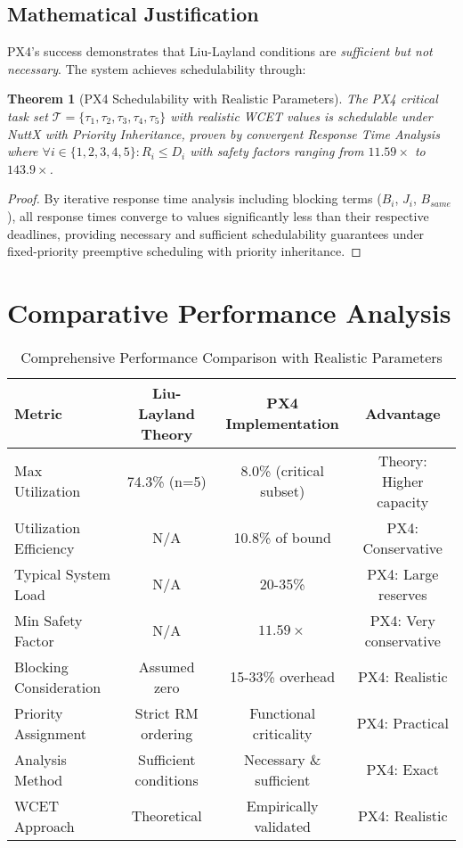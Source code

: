 \documentclass[12pt,a4paper]{article}
\newtheorem{theorem}{Theorem}
\begin{document}
\subsection{Mathematical Justification}

PX4's success demonstrates that Liu-Layland conditions are \emph{sufficient but not necessary}. The system achieves schedulability through:

\begin{theorem}[PX4 Schedulability with Realistic Parameters]
The PX4 critical task set $\mathcal{T} = \{\tau_1, \tau_2, \tau_3, \tau_4, \tau_5\}$ with realistic WCET values is schedulable under NuttX with Priority Inheritance, proven by convergent Response Time Analysis where $\forall i \in \{1,2,3,4,5\}: R_i \leq D_i$ with safety factors ranging from $11.59\times$ to $143.9\times$.
\end{theorem}

\begin{proof}
By iterative response time analysis including blocking terms ($B_i$, $J_i$, $B_{same}$), all response times converge to values significantly less than their respective deadlines, providing necessary and sufficient schedulability guarantees under fixed-priority preemptive scheduling with priority inheritance.
\end{proof}

\section{Comparative Performance Analysis}

\begin{table}[H]
\centering
\begin{tabular}{|l|c|c|c|}
\hline
\textbf{Metric} & \textbf{Liu-Layland Theory} & \textbf{PX4 Implementation} & \textbf{Advantage} \\
\hline
Max Utilization & 74.3\% (n=5) & 8.0\% (critical subset) & Theory: Higher capacity \\
Utilization Efficiency & N/A & 10.8\% of bound & PX4: Conservative \\
Typical System Load & N/A & 20-35\% & PX4: Large reserves \\
Min Safety Factor & N/A & $11.59\times$ & PX4: Very conservative \\
Blocking Consideration & Assumed zero & 15-33\% overhead & PX4: Realistic \\
Priority Assignment & Strict RM ordering & Functional criticality & PX4: Practical \\
Analysis Method & Sufficient conditions & Necessary \& sufficient & PX4: Exact \\
WCET Approach & Theoretical & Empirically validated & PX4: Realistic \\
\hline
\end{tabular}
\caption{Comprehensive Performance Comparison with Realistic Parameters}
\end{table}
\end{document}

